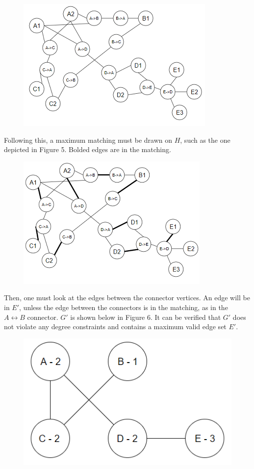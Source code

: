 \documentclass{article}
\begin{document}
	\begin{figure}[H]
		\caption{}
		\includegraphics{Figure4}
	\end{figure}

	Following this, a maximum matching must be drawn on $H$, such as the one depicted in Figure 5. Bolded edges are in the matching.
	
		\begin{figure}[H]
		\caption{}
		\includegraphics{Figure5}
	\end{figure}
		 		\vbox{%
	Then, one must look at the edges between the connector vertices. An edge will be in $E'$, unless the edge between the connectors is in the matching, as in the $A \leftrightarrow	 B$ connector. $G'$ is shown below in Figure 6. It can be verified that $G'$ does not violate any degree constraints and contains a maximum valid edge set $E'$.
}
	\begin{figure}[H]
		\caption{}
		\includegraphics{Figure6}
	\end{figure}
\end{document}
